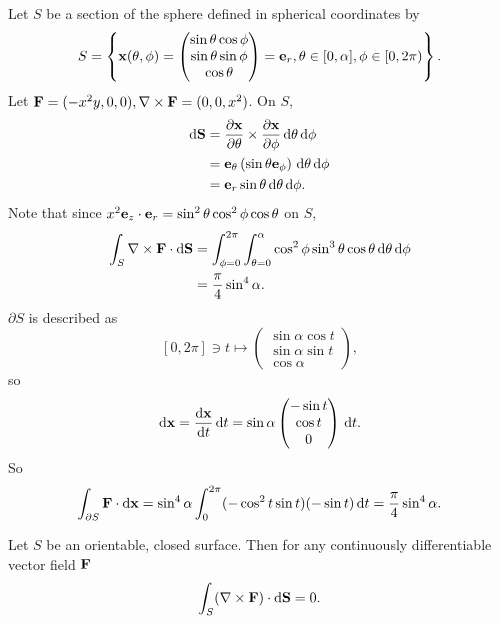 \begin{example}
    Let $S$ be a section of the sphere defined in spherical coordinates by
    \[
        S = \left\{ {\bf x}(\theta,\phi) = \begin{pmatrix}
            \sin \theta \cos \phi \\ \sin \theta \sin \phi \\ \cos \theta 
        \end{pmatrix}={\bf e}_r, \theta\in [0,\alpha],\phi\in [0,2\pi) \right\}.
    \]
    Let $ {\bf F} = (-x^2y,0,0), \nabla\times{\bf F} = (0,0,x^2) $. On $S$,
    \begin{align*}
        \mathrm{d} {\bf S} &= \frac{\partial {\bf x}}{\partial \theta} \times \frac{\partial {\bf x}}{\partial \phi}\,\mathrm{d} \theta\,\mathrm{d} \phi \\
        &= {\bf e}_\theta\left( \sin \theta {\bf e}_\phi \right) \,\mathrm{d} \theta\,\mathrm{d} \phi\\ 
        &= {\bf e}_r \sin \theta \,\mathrm{d} \theta\,\mathrm{d} \phi.
    \end{align*}
    Note that since $ x^2{\bf e}_z \cdot {\bf e}_r = \sin^2 \theta \cos^2 \phi \cos \theta $ on $S$, 
    \begin{align*}
        \int_{S} \nabla\times{\bf F} \cdot\mathrm{d}\mathbf{S} &= \int_{\phi=0}^{2\pi} \int_{\theta=0}^{\alpha} \cos^2 \phi \sin^3 \theta \cos \theta \,\mathrm{d}\theta \,\mathrm{d}\phi\\ 
        &= \frac{\pi}{4}\sin^4 \alpha.
    \end{align*}
    $ \partial S $ is described as
    \[
        [0,2\pi] \ni t \mapsto \begin{pmatrix}
            \sin \alpha \cos t \\ \sin \alpha \sin t \\ \cos \alpha
        \end{pmatrix},
    \]
    so 
    \[
        \mathrm{d} {\bf x} = \frac{\mathrm{d}{\bf x}}{\mathrm{d}t}\,\mathrm{d} t = \sin \alpha \begin{pmatrix}
            -\sin t \\ \cos t \\ 0
        \end{pmatrix}\,\mathrm{d} t. 
    \]
    So 
    \[
        \int_{\partial S} {\bf F} \cdot\mathrm{d}\mathbf{x} = \sin^4 \alpha \int_{0}^{2\pi} (-\cos^2 t \sin t)(-\sin t) \,\mathrm{d}t=\frac{\pi}{4}\sin^4 \alpha.
    \]
\end{example}
\begin{example}
    Let $S$ be an orientable, closed surface. Then for any continuously differentiable vector field ${\bf F}$
    \[
        \int_{S} (\nabla\times {\bf F}) \cdot\mathrm{d}\mathbf{S}=0.
    \]
\end{example}
